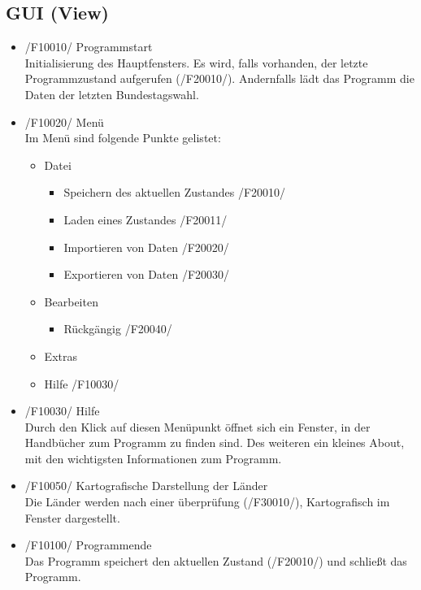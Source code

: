 \documentclass[10pt,a4paper]{article}
\begin{document}
\subsection{GUI (View)}
\begin{itemize}
	\item /F10010/ Programmstart \hfill \\
	Initialisierung des Hauptfensters. Es wird, falls vorhanden, der letzte Programmzustand aufgerufen (/F20010/). Andernfalls lädt das Programm die Daten der letzten Bundestagswahl.
	\item /F10020/ Menü \hfill \\
	Im Menü sind folgende Punkte gelistet:
	\begin{itemize}
		\item Datei
		\begin{itemize}
			\item Speichern des aktuellen Zustandes /F20010/
			\item Laden eines Zustandes /F20011/
			\item Importieren von Daten /F20020/
			\item Exportieren von Daten /F20030/
		\end{itemize}
		\item Bearbeiten
		\begin{itemize}
			\item Rückgängig /F20040/
		\end{itemize}
		\item Extras
		\item Hilfe /F10030/
	\end{itemize}
	\item /F10030/ Hilfe \hfill \\
	Durch den Klick auf diesen Menüpunkt öffnet sich ein Fenster, in der Handbücher zum Programm zu finden sind. Des weiteren ein kleines About, mit den wichtigsten Informationen zum Programm.
	\item /F10050/ Kartografische Darstellung der Länder \hfill \\
	Die Länder werden nach einer überprüfung (/F30010/), Kartografisch im Fenster dargestellt.
	\item /F10100/ Programmende \hfill \\
	Das Programm speichert den aktuellen Zustand (/F20010/) und schließt das Programm.
\end{itemize}
\end{document}
